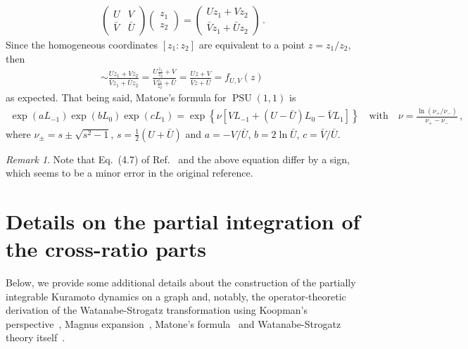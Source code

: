 \documentclass[aps,pre,reprint,longbibliography,superscriptaddress,noshowpacs,floatfix]{revtex4-2}
\theoremstyle{definition}
\theoremstyle{remark}
\newtheorem{remark}[theorem]{Remark}
\DeclareMathOperator{\PSU}{PSU}
\begin{document}
\begin{align*}
   \begin{pmatrix}U&V\\\bar{V}&\bar{U}\end{pmatrix}\begin{pmatrix}
        z_1\\z_2
    \end{pmatrix} = \begin{pmatrix}
        U z_1 + V z_2\\ \bar{V}z_1 + \bar{U}z_2
    \end{pmatrix}\,.
\end{align*}
Since the homogeneous coordinates $[z_1 :z_2]$ are equivalent to a point $z = z_1/z_2$, then
\begin{align*}    
        [U z_1 + V z_2:\bar{V}z_1 + \bar{U}z_2] \sim \frac{U z_1 + V z_2}{\bar{V}z_1 + \bar{U}z_2} = \frac{U \frac{z_1}{z_2} + V }{\bar{V}\frac{z_1}{z_2} + \bar{U}} = \frac{Uz + V}{\overline{V}z + \overline{U}} = f_{U, V}(z)\,
\end{align*}
as expected. That being said, Matone's formula for $\PSU(1,1)$ is
\begin{align}\label{eq:matoneSI}
    \exp(a L_{-1})\exp(b L_0)\exp(c L_1) =\exp\left\{\nu\left[VL_{-1} + (U - \bar{U})L_0 -\bar{V}L_1\right]\right\}\quad\text{with}\quad \nu = \frac{\ln(\nu_+/\nu_{-})}{\nu_+ - \nu_{-}}\,,
\end{align}
where $\nu_{\pm} = s\pm\sqrt{s^2 - 1}$, $s = \frac{1}{2}(U + \bar{U})$ and $a =-V/\bar{U}$, $b = 2\ln \bar{U}$, $c = \bar{V}/\bar{U}$.
\begin{remark}
    Note that Eq.~(4.7) of Ref.~\cite{Matone2015} and the above equation differ by a sign, which seems to be a minor error in the original reference. %
\end{remark}


\section{Details on the partial integration of the cross-ratio parts}
\label{subsec:partial_integration}
Below, we provide some additional details about the construction of the partially integrable Kuramoto dynamics on a graph and, notably, the operator-theoretic derivation of the Watanabe-Strogatz transformation using Koopman's perspective~\cite{Koopman1931,Koopman1932}, Magnus expansion~\cite{Magnus1954, Blanes2009}, Matone's formula~\cite{Matone2015} and Watanabe-Strogatz theory itself~\cite{Watanabe1993, Watanabe1994, Pikovsky2008, Marvel2009, Lohe2019}. 
\end{document}
